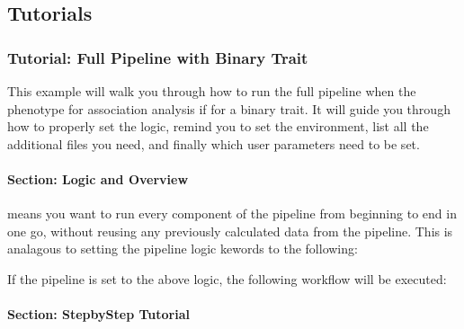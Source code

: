 \documentclass[letterpaper,10pt,english]{sphinxmanual}
\let\sphinxpxdimen\pdfpxdimen\else\newdimen\sphinxpxdimen
\begin{document}
\subsection{Tutorials}
\label{\detokenize{exampleWorkFlows:tutorials}}

\subsubsection{Tutorial: Full Pipeline with Binary Trait}
\label{\detokenize{fullPipelineBinaryTutorial:tutorial-full-pipeline-with-binary-trait}}\label{\detokenize{fullPipelineBinaryTutorial::doc}}
This example will walk you through how to run the full pipeline when the phenotype for association analysis if for a binary trait.  It will guide you through how to properly set the logic, remind you to set the environment, list all the additional files you need, and finally which user parameters need to be set.


\paragraph{Section: Logic and Overview}
\label{\detokenize{fullPipelineBinaryTutorial:section-logic-and-overview}}
 means you want to run every component of the pipeline from beginning to end in one go, without re\sphinxhyphen{}using any previously calculated data from the pipeline.  This is analagous to setting the pipeline logic kewords to the following:

\begin{sphinxVerbatim}[commandchars=\\\{\}]
\end{sphinxVerbatim}

If the pipeline is set to the above logic, the following workflow will be executed:

\noindent{\hspace*{\fill}\sphinxincludegraphics[width=400\sphinxpxdimen]{{fullPipeline_example}.png}\hspace*{\fill}}


\paragraph{Section: Step\sphinxhyphen{}by\sphinxhyphen{}Step Tutorial}
\label{\detokenize{fullPipelineBinaryTutorial:section-step-by-step-tutorial}}
\end{document}
